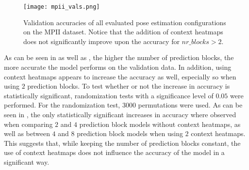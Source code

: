 \begin{figure}[htb!]
    \centering
    \texttt{[image: mpii\_vals.png]}
    \caption{Validation accuracies of all evaluated pose estimation configurations on the MPII dataset. Notice that the addition of context heatmaps does not significantly improve upon the accuracy for $nr\_blocks > 2$. }
    \label{fig:mpii_vals}
\end{figure}

As can be seen in  as well as , the higher the number of prediction blocks, the more accurate the model performs on the validation data.
In addition, using context heatmaps appears to increase the accuracy as well, especially so when using $2$ prediction blocks.
To test whether or not the increase in accuracy is statistically significant, randomization tests with a significance level of $0.05$ were performed.
For the randomization test, $3000$ permutations were used.
As can be seen in , the only statistically significant increases in accuracy where observed when comparing $2$ and $4$ prediction block models without context heatmaps, as well as between $4$ and $8$ prediction block models when using $2$ context heatmaps.
This suggests that, while keeping the number of prediction blocks constant, the use of context heatmaps does not influence the accuracy of the model in a significant way.

